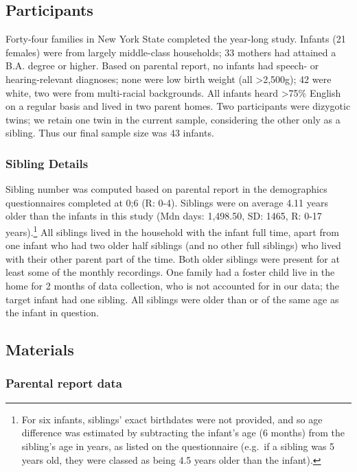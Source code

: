 \documentclass[
  english,
  man,floatsintext]{apa6}
\begin{document}
\hypertarget{participants}{%
\subsection{Participants}\label{participants}}

Forty-four families in New York State completed the year-long study. Infants (21 females) were from largely middle-class households; 33 mothers had attained a B.A. degree or higher. Based on parental report, no infants had speech- or hearing-relevant diagnoses; none were low birth weight (all \textgreater2,500g); 42 were white, two were from multi-racial backgrounds. All infants heard \textgreater75\% English on a regular basis and lived in two parent homes. Two participants were dizygotic twins; we retain one twin in the current sample, considering the other only as a sibling. Thus our final sample size was 43 infants.

\hypertarget{sibling-details}{%
\subsubsection{Sibling Details}\label{sibling-details}}

Sibling number was computed based on parental report in the demographics questionnaires completed at 0;6 (R: 0-4). Siblings were on average 4.11 years older than the infants in this study (Mdn days: 1,498.50, SD: 1465, R: 0-17 years).\footnote{For six infants, siblings' exact birthdates were not provided, and so age difference was estimated by subtracting the infant's age (6 months) from the sibling's age in years, as listed on the questionnaire (e.g.~if a sibling was 5 years old, they were classed as being 4.5 years older than the infant).} All siblings lived in the household with the infant full time, apart from one infant who had two older half siblings (and no other full siblings) who lived with their other parent part of the time. Both older siblings were present for at least some of the monthly recordings. One family had a foster child live in the home for 2 months of data collection, who is not accounted for in our data; the target infant had one sibling. All siblings were older than or of the same age as the infant in question.

\hypertarget{materials}{%
\subsection{Materials}\label{materials}}

\hypertarget{parental-report-data}{%
\subsubsection{Parental report data}\label{parental-report-data}}
\end{document}
